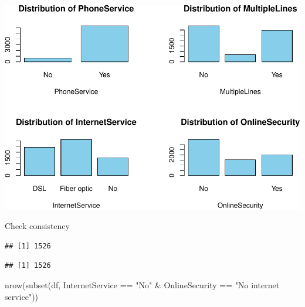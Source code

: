 \documentclass[
  twoside]{article}
\newenvironment{Shaded}{\begin{snugshade}}{\end{snugshade}}
\newcommand{\FunctionTok}[1]{\textcolor[rgb]{0.00,0.00,0.00}{#1}}
\newcommand{\NormalTok}[1]{#1}
\newcommand{\SpecialCharTok}[1]{\textcolor[rgb]{0.00,0.00,0.00}{#1}}
\newcommand{\StringTok}[1]{\textcolor[rgb]{0.31,0.60,0.02}{#1}}
\begin{document}
\includegraphics{Assigment2_files/figure-latex/unnamed-chunk-16-1.pdf}

Check consistency

\begin{Shaded}
\end{Shaded}

\begin{verbatim}
## [1] 1526
\end{verbatim}

\begin{Shaded}
\end{Shaded}

\begin{verbatim}
## [1] 1526
\end{verbatim}

\begin{Shaded}
\begin{Highlighting}[]
\FunctionTok{nrow}\NormalTok{(}\FunctionTok{subset}\NormalTok{(df, InternetService }\SpecialCharTok{==} \StringTok{"No"} \SpecialCharTok{\&}\NormalTok{ OnlineSecurity }\SpecialCharTok{==} \StringTok{"No internet service"}\NormalTok{))}
\end{Highlighting}
\end{Shaded}
\end{document}
